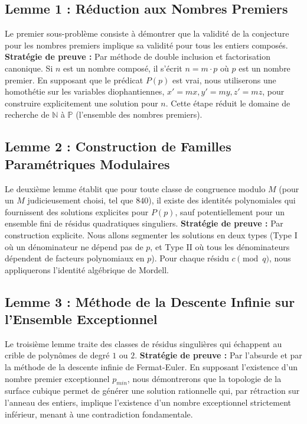 \documentclass[12pt, a4paper]{article}
\begin{document}
\subsection{Lemme 1 : Réduction aux Nombres Premiers}
Le premier sous-problème consiste à démontrer que la validité de la conjecture pour les nombres premiers implique sa validité pour tous les entiers composés.
\textbf{Stratégie de preuve :} Par méthode de double inclusion et factorisation canonique. Si $n$ est un nombre composé, il s'écrit $n = m \cdot p$ où $p$ est un nombre premier. En supposant que le prédicat $P(p)$ est vrai, nous utiliserons une homothétie sur les variables diophantiennes, $x' = mx, y' = my, z' = mz$, pour construire explicitement une solution pour $n$. Cette étape réduit le domaine de recherche de $\mathbb{N}$ à $\mathbb{P}$ (l'ensemble des nombres premiers).

\subsection{Lemme 2 : Construction de Familles Paramétriques Modulaires}
Le deuxième lemme établit que pour toute classe de congruence modulo $M$ (pour un $M$ judicieusement choisi, tel que $840$), il existe des identités polynomiales qui fournissent des solutions explicites pour $P(p)$, sauf potentiellement pour un ensemble fini de résidus quadratiques singuliers.
\textbf{Stratégie de preuve :} Par construction explicite. Nous allons segmenter les solutions en deux types (Type I où un dénominateur ne dépend pas de $p$, et Type II où tous les dénominateurs dépendent de facteurs polynomiaux en $p$). Pour chaque résidu $c \pmod q$, nous appliquerons l'identité algébrique de Mordell.

\subsection{Lemme 3 : Méthode de la Descente Infinie sur l'Ensemble Exceptionnel}
Le troisième lemme traite des classes de résidus singulières qui échappent au crible de polynômes de degré $1$ ou $2$.
\textbf{Stratégie de preuve :} Par l'absurde et par la méthode de la descente infinie de Fermat-Euler. En supposant l'existence d'un nombre premier exceptionnel $p_{min}$, nous démontrerons que la topologie de la surface cubique permet de générer une solution rationnelle qui, par rétraction sur l'anneau des entiers, implique l'existence d'un nombre exceptionnel strictement inférieur, menant à une contradiction fondamentale.
\end{document}
